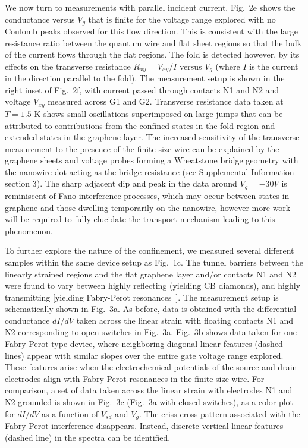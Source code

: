 \documentclass[journal=jacsat,manuscript=article]{achemso}
\begin{document}
We now turn to measurements with parallel incident current. Fig.~2e shows the conductance versus $V_g$ that is finite for the voltage range explored with no Coulomb peaks observed for this flow direction. This is consistent with the large resistance ratio between the quantum wire and flat sheet regions so that the bulk of the current flows through the flat regions. The fold is detected however, by its effects on the transverse resistance $R_{xy}=V_{xy}/I$ versus $V_{g}$ (where $I$ is the current in the direction parallel to the fold). The measurement setup is shown in the right inset of Fig.~2f, with current passed through contacts N1 and N2 and voltage $V_{xy}$ measured across G1 and G2. Transverse resistance data taken at $T = 1.5$ K shows small oscillations superimposed on large jumps that can be attributed to contributions from the confined states in the fold region and extended states in the graphene layer. The increased sensitivity of the transverse measurement to the presence of the finite size wire can be explained by the graphene sheets and voltage probes forming a Wheatstone bridge geometry with the nanowire dot acting as the bridge resistance (see Supplemental Information section 3).  The sharp adjacent dip and peak in the data around $V_g=-30 V$ is reminiscent of Fano interference processes\cite{fano1961effects}, which may occur between states in graphene and those dwelling temporarily on the nanowire, however more work will be required to fully elucidate the transport mechanism leading to this phenomenon.



To further explore the  nature of the confinement, we measured several different samples within the same device setup as Fig.~1c. The tunnel barriers between the linearly strained regions and the flat graphene layer and/or contacts N1 and N2 were found to vary between highly reflecting (yielding CB diamonds), and highly transmitting [yielding Fabry-Perot resonances~\cite{liang2001fabry}]. The measurement setup is schematically shown in  Fig.~3a. As before, data is obtained with the differential conductance $dI/dV$ taken across the linear strain with floating contacts N1 and N2 corresponding to open switches in Fig.~3a. Fig.~3b shows data taken for one Fabry-Perot type device, where neighboring diagonal linear features (dashed lines) appear with similar slopes over the entire gate voltage range explored. These features arise when the electrochemical potentials of the source and drain electrodes align with Fabry-Perot resonances in the finite size wire. For comparison, a set of data taken across the linear strain with electrodes N1 and N2 grounded is shown in Fig.~3c (Fig.~3a with closed switches), as a color plot for $dI/dV$ as a function of $V_{sd}$ and $V_{g}$. The criss-cross pattern associated with the Fabry-Perot interference disappears. Instead, discrete vertical linear features (dashed line) in the spectra can be identified. 
\end{document}
